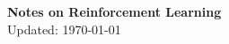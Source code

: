 \documentclass[a4paper]{article}
\begin{document}
	
\begin{center}
	\Large{\bf Notes on Reinforcement Learning }\\
	Updated: \today
\end{center}	
 
  
 

%
\end{document}
